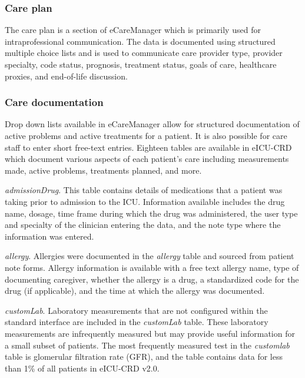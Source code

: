 \documentclass[english]{article}
\newcommand{\tblname}[1]{\emph{#1}}
\begin{document}
\subsubsection*{Care plan}\label{care-plan}

The care plan is a section of eCareManager which is primarily used for
intraprofessional communication. The data is documented using structured
multiple choice lists and is used to communicate care provider type,
provider specialty, code status, prognosis, treatment status, goals of
care, healthcare proxies, and end-of-life discussion.

\subsubsection*{Care documentation}\label{care-documentation}

Drop down lists available in eCareManager allow for structured
documentation of active problems and active treatments for a patient.
It is also possible for care staff to enter short free-text entries.
Eighteen tables are available in eICU-CRD which document various aspects of each patient's care including measurements made, active problems, treatments planned, and more.

\tblname{admissionDrug}. This table contains details of medications that a patient was taking prior to admission to the ICU.
Information available includes the drug name, dosage, time frame during which the drug was administered, the user type and specialty of the clinician entering the data, and the note type where the information was entered.

\tblname{allergy}. Allergies were documented in the \tblname{allergy} table and sourced from patient note forms. Allergy information is available with a free text allergy name, type of documenting caregiver, whether the allergy is a drug, a standardized code for the drug (if applicable), and the time at which the allergy was documented.

\tblname{customLab}. Laboratory measurements that are not configured within the standard interface are included in the \tblname{customLab} table. These laboratory measurements are infrequently measured but may provide useful information for a small subset of patients. The most frequently measured test in the \tblname{customlab} table is glomerular filtration rate (GFR), and the table contains data for less than 1\% of all patients in eICU-CRD v2.0.
\end{document}
